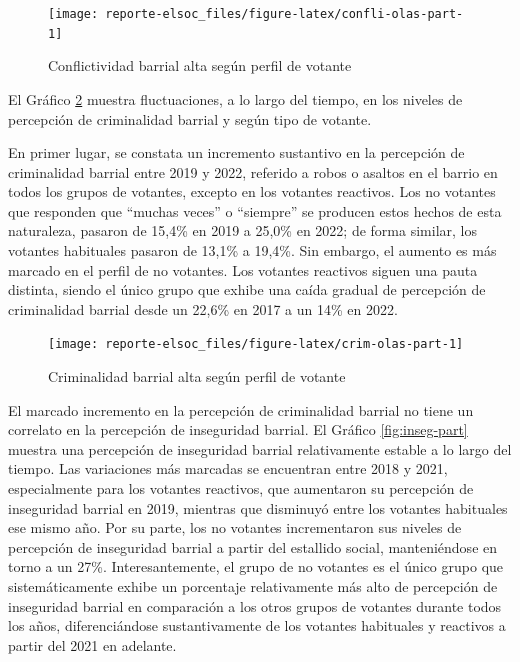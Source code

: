 \documentclass[
  12pt,
]{book}
\begin{document}
\begin{figure}

{\centering \texttt{[image: reporte-elsoc\_files/figure-latex/confli-olas-part-1]} 

}

\caption{Conflictividad barrial alta según perfil de votante}\label{fig:confli-olas-part}
\end{figure}

El Gráfico \ref{fig:crim-olas-part} muestra fluctuaciones, a lo largo del tiempo, en los niveles de percepción de criminalidad barrial y según tipo de votante.

En primer lugar, se constata un incremento sustantivo en la percepción de criminalidad barrial entre 2019 y 2022, referido a robos o asaltos en el barrio en todos los grupos de votantes, excepto en los votantes reactivos. Los no votantes que responden que ``muchas veces'' o ``siempre'' se producen estos hechos de esta naturaleza, pasaron de 15,4\% en 2019 a 25,0\% en 2022; de forma similar, los votantes habituales pasaron de 13,1\% a 19,4\%. Sin embargo, el aumento es más marcado en el perfil de no votantes. Los votantes reactivos siguen una pauta distinta, siendo el único grupo que exhibe una caída gradual de percepción de criminalidad barrial desde un 22,6\% en 2017 a un 14\% en 2022.

\begin{figure}

{\centering \texttt{[image: reporte-elsoc\_files/figure-latex/crim-olas-part-1]} 

}

\caption{Criminalidad barrial alta según perfil de votante}\label{fig:crim-olas-part}
\end{figure}

El marcado incremento en la percepción de criminalidad barrial no tiene un correlato en la percepción de inseguridad barrial. El Gráfico \ref{fig:inseg-part} muestra una percepción de inseguridad barrial relativamente estable a lo largo del tiempo. Las variaciones más marcadas se encuentran entre 2018 y 2021, especialmente para los votantes reactivos, que aumentaron su percepción de inseguridad barrial en 2019, mientras que disminuyó entre los votantes habituales ese mismo año. Por su parte, los no votantes incrementaron sus niveles de percepción de inseguridad barrial a partir del estallido social, manteniéndose en torno a un 27\%. Interesantemente, el grupo de no votantes es el único grupo que sistemáticamente exhibe un porcentaje relativamente más alto de percepción de inseguridad barrial en comparación a los otros grupos de votantes durante todos los años, diferenciándose sustantivamente de los votantes habituales y reactivos a partir del 2021 en adelante.
\end{document}

